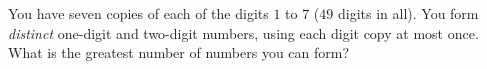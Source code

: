 You have seven copies of each of the digits $1$ to $7$ ($49$ digits in all). You form \emph{distinct} one-digit and two-digit numbers, using each digit copy at most once. What is the greatest number of numbers you can form?
